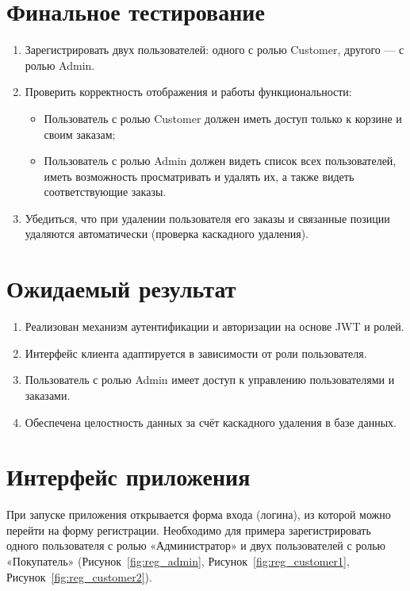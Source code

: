 \documentclass[12pt]{article}
\renewcommand{\texttt}[1]{{\small\ttfamily #1}}
\numberwithin{figure}{section}
\begin{document}
\newpage

\section{Финальное тестирование}
\begin{enumerate}
	\item Зарегистрировать двух пользователей: одного с ролью \texttt{Customer}, другого — с ролью \texttt{Admin}.
	\item Проверить корректность отображения и работы функциональности:
	      \begin{itemize}
		      \item Пользователь с ролью \texttt{Customer} должен иметь доступ только к корзине и своим заказам;
		      \item Пользователь с ролью \texttt{Admin} должен видеть список всех пользователей, иметь возможность просматривать и удалять их, а также видеть соответствующие заказы.
	      \end{itemize}
	\item Убедиться, что при удалении пользователя его заказы и связанные позиции удаляются автоматически (проверка каскадного удаления).
\end{enumerate}

\section{Ожидаемый результат}
\begin{enumerate}
	\item Реализован механизм аутентификации и авторизации на основе JWT и ролей.
	\item Интерфейс клиента адаптируется в зависимости от роли пользователя.
	\item Пользователь с ролью \texttt{Admin} имеет доступ к управлению пользователями и заказами.
	\item Обеспечена целостность данных за счёт каскадного удаления в базе данных.
\end{enumerate}

\newpage

\section{Интерфейс приложения}
При запуске приложения открывается форма входа (логина), из которой можно перейти на форму регистрации. Необходимо для примера зарегистрировать одного пользователя с ролью «Администратор» и двух пользователей с ролью «Покупатель» (Рисунок~\ref{fig:reg_admin}, Рисунок~\ref{fig:reg_customer1}, Рисунок~\ref{fig:reg_customer2}).
\end{document}
